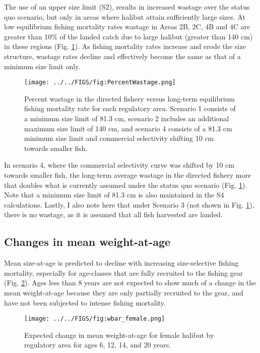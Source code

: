 The use of an upper size limit (S2), results in increased wastage over the status quo scenario, but only in areas where halibut attain sufficiently large sizes. At low equilibrium fishing mortality rates wastage in Areas 2B, 2C, 4B and 4C are greater than 10\% of the landed catch due to large halibut (greater than 140 cm) in these regions (Fig. \ref{fig:FIGS_fig:PercentWastage}).  As fishing mortality rates increase and erode the size structure, wastage rates decline and effectively become the same as that of a minimum size limit only.  

\begin{figure}[htbp]
	\centering
		\texttt{[image: ../../FIGS/fig:PercentWastage.png]}
	\caption{Percent wastage in the directed fishery versus long-term equilibrium fishing mortality rate for each regulatory area. Scenario 1 consists of a minimum size limit of 81.3 cm, scenario 2 includes an additional maximum size limit of 140 cm, and scenario 4 consists of a 81.3 cm minimum size limit and commercial selectivity shifting 10 cm towards smaller fish.}
	\label{fig:FIGS_fig:PercentWastage}
\end{figure}

In scenario 4, where the commercial selectivity curve was shifted by 10 cm towards smaller fish, the long-term average wastage in the directed fishery more that doubles what is currently assumed under the status quo scenario (Fig. \ref{fig:FIGS_fig:PercentWastage}). Note that a minimum size limit of 81.3 cm is also maintained in the S4 calculations.  Lastly, I also note here that under Scenario 3 (not shown in Fig. \ref{fig:FIGS_fig:PercentWastage}), there is no wastage, as it is assumed that all fish harvested are landed.


\subsection*{Changes in mean weight-at-age} %
\label{sub:changes_in_mean_weight_at_age}

Mean size-at-age is predicted to decline with increasing size-selective fishing mortality, especially for age-classes that are fully recruited to the fishing gear (Fig. \ref{fig:FIGS_fig:wbar_female}).  Ages less than 8 years are not expected to show much of a change in the mean weight-at-age because they are only partially recruited to the gear, and have not been subjected to intense fishing mortality.
\begin{figure}[htbp]
	\centering
		\texttt{[image: ../../FIGS/fig:wbar\_female.png]}
	\caption{Expected change in mean weight-at-age for female halibut by regulatory area for ages 6, 12, 14, and 20 years.}
	\label{fig:FIGS_fig:wbar_female}
\end{figure}

